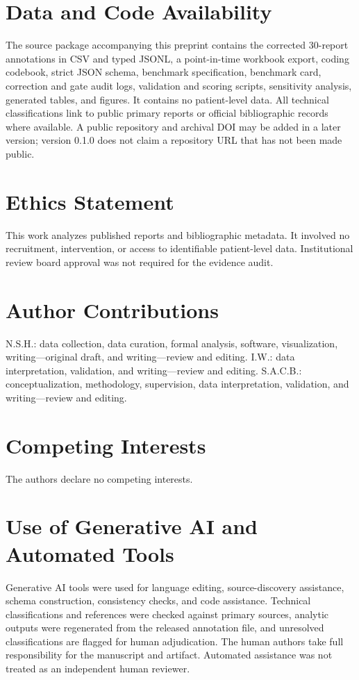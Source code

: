 \documentclass[11pt,letterpaper]{article}
\begin{document}
\section*{Data and Code Availability}

The source package accompanying this preprint contains the corrected 30-report annotations in CSV and typed JSONL, a point-in-time workbook export, coding codebook, strict JSON schema, benchmark specification, benchmark card, correction and gate audit logs, validation and scoring scripts, sensitivity analysis, generated tables, and figures. It contains no patient-level data. All technical classifications link to public primary reports or official bibliographic records where available. A public repository and archival DOI may be added in a later version; version 0.1.0 does not claim a repository URL that has not been made public.

\section*{Ethics Statement}

This work analyzes published reports and bibliographic metadata. It involved no recruitment, intervention, or access to identifiable patient-level data. Institutional review board approval was not required for the evidence audit.

\section*{Author Contributions}

N.S.H.: data collection, data curation, formal analysis, software, visualization, writing---original draft, and writing---review and editing. I.W.: data interpretation, validation, and writing---review and editing. S.A.C.B.: conceptualization, methodology, supervision, data interpretation, validation, and writing---review and editing.

\section*{Competing Interests}

The authors declare no competing interests.

\section*{Use of Generative AI and Automated Tools}

Generative AI tools were used for language editing, source-discovery assistance, schema construction, consistency checks, and code assistance. Technical classifications and references were checked against primary sources, analytic outputs were regenerated from the released annotation file, and unresolved classifications are flagged for human adjudication. The human authors take full responsibility for the manuscript and artifact. Automated assistance was not treated as an independent human reviewer.
\end{document}
